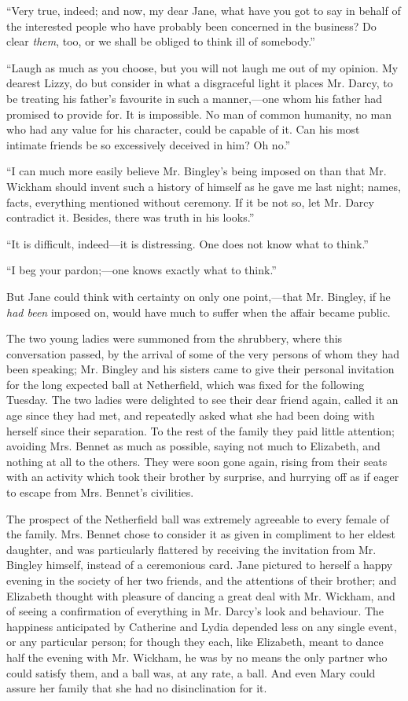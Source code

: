 ``Very true, indeed; and now, my dear Jane, what have you got to say in behalf of the interested people who have probably been concerned in the business? Do clear \textit{them}, too, or we shall be obliged to think ill of somebody.''

``Laugh as much as you choose, but you will not laugh me out of my opinion. My dearest Lizzy, do but consider in what a disgraceful light it places Mr. Darcy, to be treating his father's favourite in such a manner,---one whom his father had promised to provide for. It is impossible. No man of common humanity, no man who had any value for his character, could be capable of it. Can his most intimate friends be so excessively deceived in him? Oh no.''

``I can much more easily believe Mr. Bingley's being imposed on than that Mr. Wickham should invent such a history of himself as he gave me last night; names, facts, everything mentioned without ceremony. If it be not so, let Mr. Darcy contradict it. Besides, there was truth in his looks.''

``It is difficult, indeed---it is distressing. One does not know what to think.''

``I beg your pardon;---one knows exactly what to think.''

But Jane could think with certainty on only one point,---that Mr. Bingley, if he \textit{had been} imposed on, would have much to suffer when the affair became public.

The two young ladies were summoned from the shrubbery, where this conversation passed, by the arrival of some of the very persons of whom they had been speaking; Mr. Bingley and his sisters came to give their personal invitation for the long expected ball at Netherfield, which was fixed for the following Tuesday. The two ladies were delighted to see their dear friend again, called it an age since they had met, and repeatedly asked what she had been doing with herself since their separation. To the rest of the family they paid little attention; avoiding Mrs. Bennet as much as possible, saying not much to Elizabeth, and nothing at all to the others. They were soon gone again, rising from their seats with an activity which took their brother by surprise, and hurrying off as if eager to escape from Mrs. Bennet's civilities.

The prospect of the Netherfield ball was extremely agreeable to every female of the family. Mrs. Bennet chose to consider it as given in compliment to her eldest daughter, and was particularly flattered by receiving the invitation from Mr. Bingley himself, instead of a ceremonious card. Jane pictured to herself a happy evening in the society of her two friends, and the attentions of their brother; and Elizabeth thought with pleasure of dancing a great deal with Mr. Wickham, and of seeing a confirmation of everything in Mr. Darcy's look and behaviour. The happiness anticipated by Catherine and Lydia depended less on any single event, or any particular person; for though they each, like Elizabeth, meant to dance half the evening with Mr. Wickham, he was by no means the only partner who could satisfy them, and a ball was, at any rate, a ball. And even Mary could assure her family that she had no disinclination for it.

